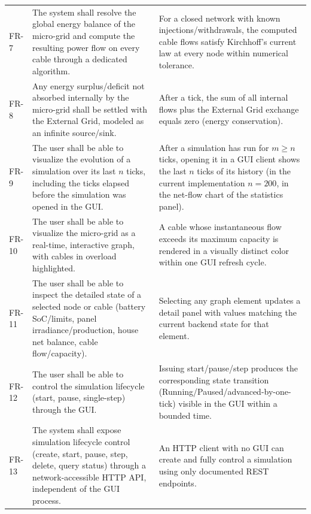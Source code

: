 \documentclass{scrreprt}
\begin{document}
\begin{longtable}{@{}p{1.5cm} p{6.3cm} p{6.3cm}@{}}
  FR-7 &
  The system shall resolve the global energy balance of the micro-grid and
  compute the resulting power flow on every cable through a dedicated
  algorithm. &
  For a closed network with known injections/withdrawals, the computed cable
  flows satisfy Kirchhoff's current law at every node within numerical
  tolerance. \\

  FR-8 &
  Any energy surplus/deficit not absorbed internally by the micro-grid shall
   be
  settled with the External Grid, modeled as an infinite source/sink. &
  After a tick, the sum of all internal flows plus the External Grid
  exchange
  equals zero (energy conservation). \\

  FR-9 &
  The user shall be able to visualize the evolution of a simulation over its
  last $n$ ticks, including the ticks elapsed before the simulation was
  opened in the GUI. &
  After a simulation has run for $m \geq n$ ticks, opening it in a GUI
  client shows the last $n$ ticks of its history (in the current
  implementation $n = 200$, in the net-flow chart of the statistics
  panel). \\

  FR-10 &
  The user shall be able to visualize the micro-grid as a real-time,
  interactive graph, with cables in
  overload highlighted. &
  A cable whose instantaneous flow exceeds its maximum capacity is rendered
  in
  a visually distinct color within one GUI refresh cycle. \\

  FR-11 &
  The user shall be able to inspect the detailed state of a selected node or
  cable (battery SoC/limits, panel irradiance/production, house net balance,
  cable flow/capacity). &
  Selecting any graph element updates a detail panel with values matching
  the
  current backend state for that element. \\

  FR-12 &
  The user shall be able to control the simulation lifecycle (start, pause,
  single-step) through the GUI. &
  Issuing start/pause/step produces the corresponding state transition
  (Running/Paused/advanced-by-one-tick) visible in the GUI within a bounded
  time. \\

  FR-13 &
  The system shall expose simulation lifecycle control (create, start,
  pause,
  step, delete, query status) through a network-accessible HTTP API,
  independent of the GUI process. &
  An HTTP client with no GUI can create and fully control a simulation using
  only documented REST endpoints. \\


\end{longtable}
\end{document}
